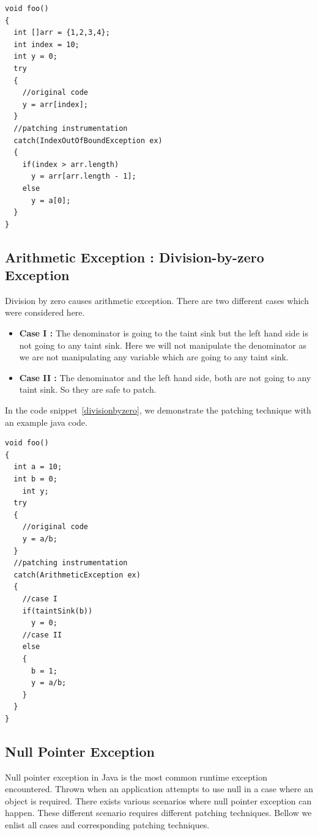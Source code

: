 \begin{lstlisting}
void foo()
{
  int []arr = {1,2,3,4};
  int index = 10;
  int y = 0;
  try
  {
    //original code
    y = arr[index];
  }
  //patching instrumentation
  catch(IndexOutOfBoundException ex)
  {
    if(index > arr.length)
      y = arr[arr.length - 1];
    else
      y = a[0];
  }
}

\end{lstlisting}


\doublespacing
\subsection{Arithmetic Exception : Division-by-zero Exception}

Division by zero causes arithmetic exception. There are two different cases which were considered here. 
\begin{itemize}
 
 \item \textbf{Case I :} The denominator is going to the taint sink but the left
 hand side is not going to any taint sink.
 Here we will not manipulate the denominator as we are not manipulating any
 variable which are going to any taint sink.
 
 \item \textbf{Case II :} The denominator and the left hand side, both are not
 going to any taint sink. So they are safe to patch.

\end{itemize}

In the code snippet~\ref{divisionbyzero}, we demonstrate the patching technique
with an example java code.


\onehalfspacing
\lstset{language=Java, caption=arithmetic exception : division-by-zero patching,
label=divisionbyzero}

\begin{lstlisting}
void foo()
{
  int a = 10;
  int b = 0;
	int y;
  try
  {
    //original code
    y = a/b;
  }
  //patching instrumentation
  catch(ArithmeticException ex)
  {
    //case I
    if(taintSink(b))
      y = 0;
    //case II
    else
    {
      b = 1;
      y = a/b;
    }
  }
}
\end{lstlisting}


\doublespacing
\subsection{Null Pointer Exception}

Null pointer exception in Java is the most common runtime exception encountered. 
Thrown when an application attempts to use null in a case where an object is
required. There exists various scenarios where null pointer exception can
happen. These different scenario requires different patching techniques. Bellow
we enlist all cases and corresponding patching techniques.


